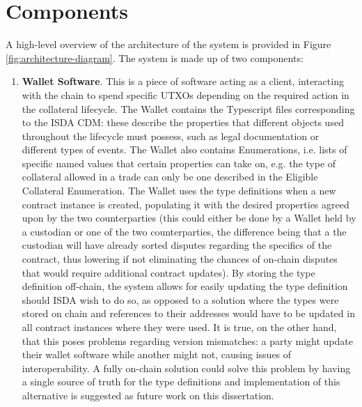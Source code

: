 \section{Components}
\label{sec:components}

A high-level overview of the architecture of the system is provided in Figure \ref{fig:architecture-diagram}. The system is made up of two components:

\begin{enumerate}
    \item \label{item:wallet}\textbf{Wallet Software}. This is a piece of software acting as a client, interacting with the chain to spend specific UTXOs depending on the required action in the collateral lifecycle. The Wallet contains the Typescript files corresponding to the ISDA CDM: these describe the properties that different objects used throughout the lifecycle must possess, such as legal documentation or different types of events. The Wallet also contains Enumerations, i.e. lists of specific named values that certain properties can take on, e.g. the type of collateral allowed in a trade can only be one described in the Eligible Collateral Enumeration. The Wallet uses the type definitions when a new contract instance is created, populating it with the desired properties agreed upon by the two counterparties (this could either be done by a Wallet held by a custodian or one of the two counterparties, the difference being that a the custodian will have already sorted disputes regarding the specifics of the contract, thus lowering if not eliminating the chances of on-chain disputes that would require additional contract updates). By storing the type definition off-chain, the system allows for easily updating the type definition should ISDA wish to do so, as opposed to a solution where the types were stored on chain and references to their addresses would have to be updated in all contract instances where they were used. It is true, on the other hand, that this poses problems regarding version mismatches: a party might update their wallet software while another might not, causing issues of interoperability. A fully on-chain solution could solve this problem by having a single source of truth for the type definitions and implementation of this alternative is suggested as future work on this dissertation.


\end{enumerate}
